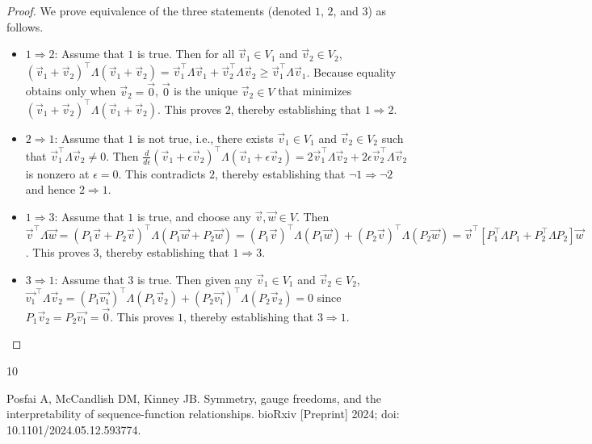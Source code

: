 \documentclass{article}
\numberwithin{myclaim}{section}
\begin{document}
\begin{proof}
We prove equivalence of the three statements (denoted $1$, $2$, and $3$) as follows.
\begin{itemize}
    \item $1 \Rightarrow 2$: Assume that $1$ is true. Then for all $\vec{v}_1 \in V_1$ and $\vec{v}_2 \in V_2$, $(\vec{v}_1 + \vec{v}_2)^\top \Lambda (\vec{v}_1 + \vec{v}_2) = \vec{v}_1^\top \Lambda \vec{v}_1 +  \vec{v}_2^\top \Lambda \vec{v}_2 \geq \vec{v}_1^\top \Lambda \vec{v}_1$. Because equality obtains only when $\vec{v}_2 = \vec{0}$, $\vec{0}$ is the unique $\vec{v}_2 \in V$ that minimizes $(\vec{v}_1 + \vec{v}_2)^\top \Lambda (\vec{v}_1 + \vec{v}_2)$. This proves $2$, thereby establishing that $1 \Rightarrow 2$. 
    \item $2 \Rightarrow 1$: Assume that $1$ is not true, i.e., there exists $\vec{v}_1 \in V_1$ and $\vec{v}_2 \in V_2$ such that $\vec{v}_1^\top \Lambda \vec{v}_2 \neq 0$. Then $\frac{d}{d\epsilon} (\vec{v}_1 + \epsilon \vec{v}_2)^\top \Lambda (\vec{v}_1 + \epsilon \vec{v}_2) = 2 \vec{v}_1^\top \Lambda \vec{v}_2 + 2 \epsilon \vec{v}_2^\top \Lambda \vec{v}_2 $ is nonzero at $\epsilon = 0$. This contradicts $2$, thereby establishing that $\neg 1 \Rightarrow \neg 2 $ and hence $2 \Rightarrow 1$.
    \item $1 \Rightarrow 3$: Assume that $1$ is true, and choose any $\vec{v}, \vec{w} \in V$. Then $\vec{v}^\top \Lambda \vec{w} = (P_1 \vec{v} + P_2 \vec{v})^\top \Lambda (P_1 \vec{w} + P_2 \vec{w}) = (P_1 \vec{v})^\top \Lambda (P_1 \vec{w}) + (P_2 \vec{v})^\top \Lambda (P_2 \vec{w}) = \vec{v}^\top \left[P_1^\top \Lambda P_1 + P_2^\top \Lambda P_2 \right] \vec{w}$. This proves $3$, thereby establishing that $1 \Rightarrow 3$. 
    \item $3 \Rightarrow 1$: Assume that $3$ is true. Then given any $\vec{v}_1 \in V_1$ and $\vec{v}_2 \in V_2$, $\vec{v_1}^\top \Lambda \vec{v}_2 = (P_1 \vec{v_1})^\top \Lambda (P_1 \vec{v}_2) + (P_2 \vec{v_1})^\top \Lambda (P_2 \vec{v}_2) = 0$ since $P_1 \vec{v}_2 = P_2 \vec{v_1} = \vec{0}$. This proves $1$, thereby establishing that $3 \Rightarrow 1$. 
\end{itemize}
\end{proof}

%

\begin{thebibliography}{10}

 Posfai A, McCandlish DM, Kinney JB. Symmetry, gauge freedoms, and the interpretability of sequence-function relationships. bioRxiv [Preprint] 2024; doi: 10.1101/2024.05.12.593774. %

\end{thebibliography}
\end{document}
